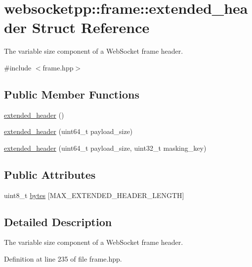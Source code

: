 \hypertarget{structwebsocketpp_1_1frame_1_1extended__header}{}\section{websocketpp\+:\+:frame\+:\+:extended\+\_\+header Struct Reference}
\label{structwebsocketpp_1_1frame_1_1extended__header}


The variable size component of a Web\+Socket frame header.  




{\ttfamily \#include $<$frame.\+hpp$>$}

\subsection*{Public Member Functions}
\begin{DoxyCompactItemize}
\item 
\hyperlink{structwebsocketpp_1_1frame_1_1extended__header_a6015c1b4ce066acdaef80e83b716b09e}{extended\+\_\+header} ()
\item 
\hyperlink{structwebsocketpp_1_1frame_1_1extended__header_a0fdbc1aaf81b56d61cc962fd724d3ffa}{extended\+\_\+header} (uint64\+\_\+t payload\+\_\+size)
\item 
\hyperlink{structwebsocketpp_1_1frame_1_1extended__header_af94b7d3a232117abfbd2b876025ab451}{extended\+\_\+header} (uint64\+\_\+t payload\+\_\+size, uint32\+\_\+t masking\+\_\+key)
\end{DoxyCompactItemize}
\subsection*{Public Attributes}
\begin{DoxyCompactItemize}
\item 
uint8\+\_\+t \hyperlink{structwebsocketpp_1_1frame_1_1extended__header_a64507c32b568d0894b2bf3a2513debd1}{bytes} \mbox{[}M\+A\+X\+\_\+\+E\+X\+T\+E\+N\+D\+E\+D\+\_\+\+H\+E\+A\+D\+E\+R\+\_\+\+L\+E\+N\+G\+T\+H\mbox{]}
\end{DoxyCompactItemize}


\subsection{Detailed Description}
The variable size component of a Web\+Socket frame header. 

Definition at line 235 of file frame.\+hpp.



